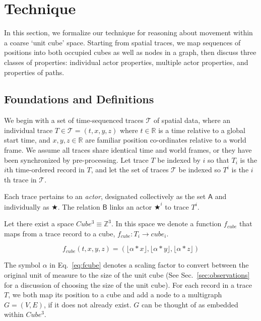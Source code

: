 \section{Technique}
\label{sec:technique}

In this section, we formalize our technique for reasoning about movement within a coarse `unit cube' space.
Starting from spatial traces, we map sequences of positions into both occupied cubes as well as nodes in a graph, then discuss three classes of properties: individual actor properties, multiple actor properties, and properties of paths.

\subsection{Foundations and Definitions}
We begin with a set of time-sequenced traces $\mathcal{T}$ of spatial data, where an individual trace $T\in\mathcal{T} = (t,x,y,z)$ where $t\in\mathbb{R}$ is a time relative to a global start time, and $x,y,z\in \mathbb{R}$ are familiar position co-ordinates relative to a world frame. 
We assume all traces share identical time and world frames, or they have been synchronized by pre-processing.
Let trace $T$ be indexed by $i$ so that $T_i$ is the $i$th time-ordered record in $T$, and let the set of traces $\mathcal{T}$ be indexed so $T^i$ is the $i$th trace in $\mathcal{T}$. 

Each trace pertains to an \emph{actor}, designated collectively as the set $\mathsf{A}$ and individually as $\bigstar$. 
The relation $\mathsf{B}$ links an actor $\bigstar^i$ to trace $T^i$.


Let there exist a space $Cube^3 \equiv \mathbb{Z}^3$.  In this space we denote a function $f_{cube}$ that maps from a trace record to a cube, $f_{cube} : T_i \rightarrow cube_i$. 


\begin{equation}
f_{cube}(t,x,y,z) = (\lfloor \alpha * x \rfloor, \lfloor \alpha * y \rfloor , \lfloor \alpha * z \rfloor )
\label{eq:fcube}
\end{equation}

The symbol $\alpha$ in Eq.~\ref{eq:fcube} denotes a scaling factor to convert between the original unit of measure to the size of the unit cube (See Sec.~\ref{sec:observations} for a discussion of choosing the size of the unit cube).
For each record in a trace $T$, we both map its position to a cube and add a node to a multigraph $G = (V,E)$, if it does not already exist. $G$ can be thought of as embedded within $Cube^3$.

